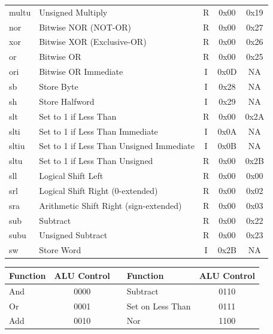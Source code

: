 \begin{tabular}{llccc}
multu    & Unsigned Multiply     	                & R    & 0x00   & 0x19 \\
nor      & Bitwise NOR (NOT-OR)	                    & R    & 0x00   & 0x27 \\
xor      & Bitwise XOR (Exclusive-OR)	            & R    & 0x00   & 0x26 \\
or       & Bitwise OR	                            & R    & 0x00   & 0x25 \\
ori      & Bitwise OR Immediate	                    & I    & 0x0D   & NA \\
sb       & Store Byte	                            & I    & 0x28   & NA \\
sh       & Store Halfword	                        & I    & 0x29   & NA \\
slt      & Set to 1 if Less Than	                & R    & 0x00   & 0x2A \\
slti     & Set to 1 if Less Than Immediate	        & I    & 0x0A   & NA \\
sltiu    & Set to 1 if Less Than Unsigned Immediate	& I    & 0x0B   & NA \\
sltu     & Set to 1 if Less Than Unsigned	        & R    & 0x00   & 0x2B \\
sll      & Logical Shift Left	                    & R    & 0x00   & 0x00 \\
srl      & Logical Shift Right (0-extended)	        & R    & 0x00   & 0x02 \\
sra      & Arithmetic Shift Right (sign-extended)	& R    & 0x00   & 0x03 \\
sub      & Subtract	                                & R    & 0x00   & 0x22 \\
subu     & Unsigned Subtract	                    & R    & 0x00   & 0x23 \\
sw       & Store Word	                            & I    & 0x2B   & NA \\
\end{tabular}

\vspace{.1in}\noindent
\begin{tabular}{lcp{.2in}lc}\hline
Function          & ALU Control  && Function          & ALU Control  \\\hline
And               & 0000         && Subtract          & 0110         \\
Or                & 0001         && Set on Less Than  & 0111         \\
Add               & 0010         && Nor               & 1100         \\\hline
\end{tabular}

